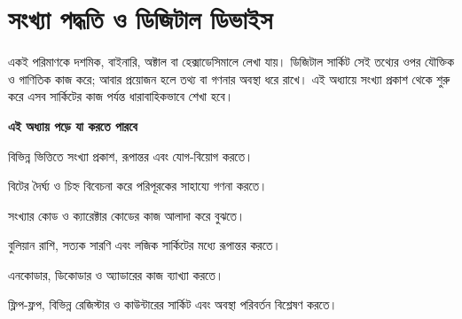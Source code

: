 \begingroup
\providecommand{\chThreeRoot}{}

\chapter{সংখ্যা পদ্ধতি ও ডিজিটাল ডিভাইস}
একই পরিমাণকে দশমিক, বাইনারি, অক্টাল বা হেক্সাডেসিমালে লেখা যায়। ডিজিটাল সার্কিট সেই তথ্যের ওপর যৌক্তিক ও গাণিতিক কাজ করে; আবার প্রয়োজন হলে তথ্য বা গণনার অবস্থা ধরে রাখে। এই অধ্যায়ে সংখ্যা প্রকাশ থেকে শুরু করে এসব সার্কিটের কাজ পর্যন্ত ধারাবাহিকভাবে শেখা হবে।
\begin{learningbox}
\textbf{এই অধ্যায় পড়ে যা করতে পারবে}
\begin{compactpoints}
\item বিভিন্ন ভিত্তিতে সংখ্যা প্রকাশ, রূপান্তর এবং যোগ-বিয়োগ করতে।
\item বিটের দৈর্ঘ্য ও চিহ্ন বিবেচনা করে পরিপূরকের সাহায্যে গণনা করতে।
\item সংখ্যার কোড ও ক্যারেক্টার কোডের কাজ আলাদা করে বুঝতে।
\item বুলিয়ান রাশি, সত্যক সারণি এবং লজিক সার্কিটের মধ্যে রূপান্তর করতে।
\item এনকোডার, ডিকোডার ও অ্যাডারের কাজ ব্যাখ্যা করতে।
\item ফ্লিপ-ফ্লপ, বিভিন্ন রেজিস্টার ও কাউন্টারের সার্কিট এবং অবস্থা পরিবর্তন বিশ্লেষণ করতে।
\end{compactpoints}
\end{learningbox}
























\endgroup
